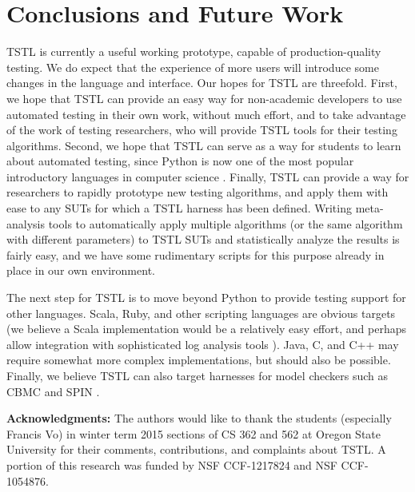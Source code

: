 \documentclass{sig-alternate}
\begin{document}
\section{Conclusions and Future Work}

TSTL is currently a useful working prototype, capable of
production-quality testing.  We do expect that the experience of more
users will introduce some changes in the language and interface.  Our
hopes for TSTL are threefold.  First, we hope that TSTL can provide an
easy way for non-academic developers to use automated testing in their
own work, without much effort, and to take advantage of the work of
testing researchers, who will provide TSTL tools for their testing
algorithms.  Second, we hope that TSTL can serve as a way for students
to learn about automated testing, since Python is now one of the most
popular introductory languages in computer science \cite{PythonPop}.
Finally, TSTL can provide a way for researchers to rapidly prototype
new testing algorithms, and apply them with ease to any SUTs for which
a TSTL harness has been defined.  Writing meta-analysis tools to
automatically apply multiple algorithms (or the same algorithm with
different parameters) to TSTL SUTs and statistically analyze the
results is fairly easy, and we have some rudimentary scripts for this
purpose already in place in our own environment.

The next step for TSTL is to move beyond Python to provide testing
support for other languages.  Scala, Ruby, and other scripting
languages are obvious targets (we believe a Scala implementation would
be a relatively easy effort, and perhaps allow integration with
sophisticated log analysis tools \cite{KlausTool}).  Java, C, and C++
may require somewhat more complex implementations, but should also be
possible.  Finally, we believe TSTL can also target harnesses for
model checkers such as CBMC \cite{CBMCp} and SPIN \cite{SPIN}.

{\bf Acknowledgments:} The authors would like to thank the students
  (especially Francis Vo) in winter term 2015 sections of CS 362 and
  562 at Oregon State University for their comments, contributions,
  and complaints about TSTL.  A portion of this research was funded by
  NSF CCF-1217824 and NSF CCF-1054876.




\newpage
\end{document}
